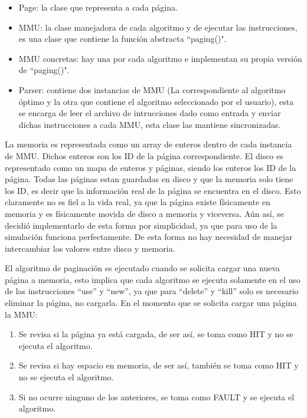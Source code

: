 \documentclass{report}
\begin{document}
\begin{itemize}
    \item Page: la clase que representa a cada página.
    \item MMU: la clase manejadora de cada algoritmo y de ejecutar las instrucciones, es una clase que contiene la función  abstracta ``paging()".
    \item MMU concretas: hay una por cada algoritmo e implementan su propia versión de ``paging()".
    \item Parser: contiene dos instancias de MMU (La correspondiente al algoritmo óptimo y la otra que contiene el algoritmo seleccionado por el usuario), esta se encarga de leer el archivo de intrucciones dado como entrada y enviar dichas instrucciones a cada MMU, esta clase las mantiene sincronizadas. 
\end{itemize}

La memoria es representada como un array de enteros dentro de cada instancia de MMU. 
Dichos enteros son los ID de la página correspondiente. 
El disco es representado como un mapa de enteros y páginas, siendo los enteros los ID de la página.
Todas las páginas estan guardadas en disco y que la memoria solo tiene los ID, es decir que la información real de la página se encuentra en el disco.
Esto claramente no es fiel a la vida real, ya que la página existe físicamente en memoria y es físicamente movida de disco a memoria y viceversa.
Aún así, se decidió implementarlo de esta forma por simplicidad, ya que para uso de la simulación funciona perfectamente.
De esta forma no hay necesidad de manejar intercambiar los valores entre disco y memoria.

El algoritmo de paginación es ejecutado cuando se solicita cargar una nueva página a memoria, esto implica que cada algoritmo se ejecuta solamente en el uso de las instrucciones ``use''  y ``new'', ya que para ``delete''  y ``kill'' solo es necesario eliminar la página, no cargarla.
En el momento que se solicita cargar una página la MMU:
\begin{enumerate}
    \item Se revisa si la página ya está cargada, de ser así, se toma como HIT y no se ejecuta el algoritmo.
    \item Se revisa si hay espacio en memoria, de ser así, también se toma como HIT y no se ejecuta el algoritmo. 
    \item Si no ocurre ninguno de los anteriores, se toma como FAULT y se ejecuta el algoritmo.
\end{enumerate}
\end{document}
